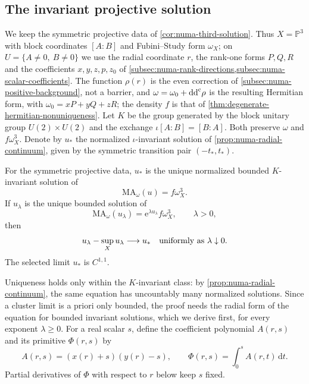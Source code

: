 \subsection{The invariant projective solution}
\label{sec:numa-selected-limit}

We keep the symmetric projective data of \cref{cor:numa-third-solution}. Thus $X=\mathbb P^3$ with block coordinates $[A:B]$ and Fubini--Study form $\omega_X$; on $U=\{A\ne0,\ B\ne0\}$ we use the radial coordinate $r$, the rank-one forms $P,Q,R$ and the coefficients $x,y,z,p,z_0$ of \cref{subsec:numa-rank-directions,subsec:numa-scalar-coefficients}. The function $\rho(r)$ is the even correction of \cref{subsec:numa-positive-background}, not a barrier, and $\omega=\omega_0+\mathrm{dd}^{\mathrm{c}}\rho$ is the resulting Hermitian form, with $\omega_0=xP+yQ+zR$; the density $f$ is that of \cref{thm:degenerate-hermitian-nonuniqueness}. Let $K$ be the group generated by the block unitary group $U(2)\times U(2)$ and the exchange $\iota[A:B]=[B:A]$. Both preserve $\omega$ and $f\omega_X^3$. Denote by $u_*$ the normalized $\iota$-invariant solution of \cref{prop:numa-radial-continuum}, given by the symmetric transition pair $(-t_*,t_*)$.

\begin{theorem}\label{thm:numa-selected-limit}
For the symmetric projective data, $u_*$ is the unique normalized bounded $K$-invariant solution of
\[
 \mathrm{MA}_\omega(u)=f\omega_X^3.
\]
If $u_\lambda$ is the unique bounded solution of
\[
 \mathrm{MA}_\omega(u_\lambda)
      =\mathrm{e}^{\lambda u_\lambda}f\omega_X^3,\qquad\lambda>0,
\]
then
\[
 u_\lambda-\sup_Xu_\lambda\longrightarrow u_*
       \quad\hbox{uniformly as }\lambda\downarrow0.
\]
The selected limit $u_*$ is $C^{1,1}$.
\end{theorem}

Uniqueness holds only within the $K$-invariant class: by \cref{prop:numa-radial-continuum}, the same equation has uncountably many normalized solutions. Since a cluster limit is a priori only bounded, the proof needs the radial form of the equation for bounded invariant solutions, which we derive first, for every exponent $\lambda\geq0$. For a real scalar $s$, define the coefficient polynomial $A(r,s)$ and its primitive $\Phi(r,s)$ by
\[
 A(r,s)=(x(r)+s)(y(r)-s),\qquad
 \Phi(r,s)=\int_0^s A(r,t)\,\mathrm{d}t.
\]
Partial derivatives of $\Phi$ with respect to $r$ below keep $s$ fixed.


